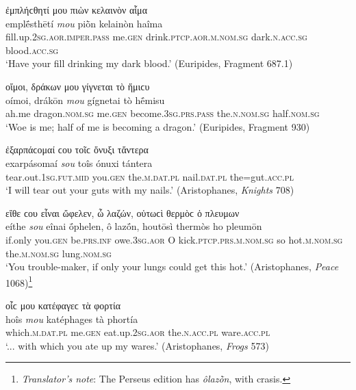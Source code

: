 \begin{exe}
\ex ἐμπλήϲθητί μου πιὼν κελαινὸν αἷμα\\
\gll emplḗsthētí \emph{mou} piṑn kelainòn haîma\\
fill.up.\textsc{2sg.aor.imper.pass} me.\textsc{gen} drink.\textsc{ptcp.aor.m.nom.sg} dark.\textsc{n.acc.sg} blood.\textsc{acc.sg}\\
\trans `Have your fill drinking my dark blood.' (Euripides, Fragment 687.1)
\label{gensep20}
\end{exe}

\begin{exe}
\ex οἴμοι, δράκων μου γίγνεται τὸ ἥμιϲυ\\
\gll oímoi, drákōn \emph{mou} gígnetai tò hḗmisu\\
ah.me dragon.\textsc{nom.sg} me.\textsc{gen} become.\textsc{3sg.prs.pass} the.\textsc{n.nom.sg} half.\textsc{nom.sg}\\
\trans `Woe is me; half of me is becoming a dragon.' (Euripides, Fragment 930)
\label{gensep21}
\end{exe}

\begin{exe}
\ex ἐξαρπάϲομαί ϲου τοῖϲ ὄνυξι τἄντερα\\
\gll exarpásomaí \emph{sou} toîs ónuxi tántera\\
tear.out.\textsc{1sg.fut.mid} you.\textsc{gen} the.\textsc{m.dat.pl} nail.\textsc{dat.pl} the=gut.\textsc{acc.pl}\\
\trans `I will tear out your guts with my nails.' (Aristophanes, \textit{Knights} 708)
\label{gensep22}
\end{exe}

\begin{exe}
\ex εἴθε ϲου εἶναι ὤφελεν, ὦ λαζών, οὑτωϲὶ θερμὸϲ ὁ πλευμων\\
\gll eíthe \emph{sou} eînai ṓphelen, ô lazṓn, houtōsì thermòs ho pleumōn\\
if.only you.\textsc{gen} be.\textsc{prs.inf} owe.\textsc{3sg.aor} O kick.\textsc{ptcp.prs.m.nom.sg} so hot.\textsc{m.nom.sg} the.\textsc{m.nom.sg} lung.\textsc{nom.sg}\\
\trans `You trouble-maker, if only your lungs could get this hot.' (Aristophanes, \textit{Peace} 1068)\footnote{\emph{Translator's note}: The Perseus edition has \textit{ôlazṑn}, with crasis.}
\label{gensep23}
\end{exe}

\begin{exe}
\ex οἷϲ μου κατέφαγεϲ τὰ φορτία\\
\gll hoîs \emph{mou} katéphages tà phortía\\
which.\textsc{m.dat.pl} me.\textsc{gen} eat.up.\textsc{2sg.aor} the.\textsc{n.acc.pl} ware.\textsc{acc.pl}\\
\trans `... with which you ate up my wares.' (Aristophanes, \textit{Frogs} 573)
\label{gensep24}
\end{exe}

